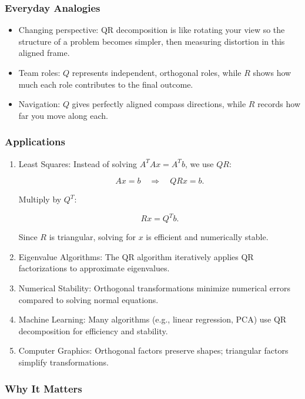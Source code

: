 \documentclass[
  letterpaper,
  DIV=11,
  numbers=noendperiod]{scrreprt}
\providecommand{\tightlist}{%
  \setlength{\itemsep}{0pt}\setlength{\parskip}{0pt}}
\begin{document}
\subsubsection{Everyday Analogies}\label{everyday-analogies-73}

\begin{itemize}
\tightlist
\item
  Changing perspective: QR decomposition is like rotating your view so
  the structure of a problem becomes simpler, then measuring distortion
  in this aligned frame.
\item
  Team roles: \(Q\) represents independent, orthogonal roles, while
  \(R\) shows how much each role contributes to the final outcome.
\item
  Navigation: \(Q\) gives perfectly aligned compass directions, while
  \(R\) records how far you move along each.
\end{itemize}

\subsubsection{Applications}\label{applications-39}

\begin{enumerate}
\def\labelenumi{\arabic{enumi}.}
\item
  Least Squares: Instead of solving \(A^T A x = A^T b\), we use \(QR\):

  \[
  Ax = b \quad \Rightarrow \quad QRx = b.
  \]

  Multiply by \(Q^T\):

  \[
  Rx = Q^T b.
  \]

  Since \(R\) is triangular, solving for \(x\) is efficient and
  numerically stable.
\item
  Eigenvalue Algorithms: The QR algorithm iteratively applies QR
  factorizations to approximate eigenvalues.
\item
  Numerical Stability: Orthogonal transformations minimize numerical
  errors compared to solving normal equations.
\item
  Machine Learning: Many algorithms (e.g., linear regression, PCA) use
  QR decomposition for efficiency and stability.
\item
  Computer Graphics: Orthogonal factors preserve shapes; triangular
  factors simplify transformations.
\end{enumerate}

\subsubsection{Why It Matters}\label{why-it-matters-73}
\end{document}
